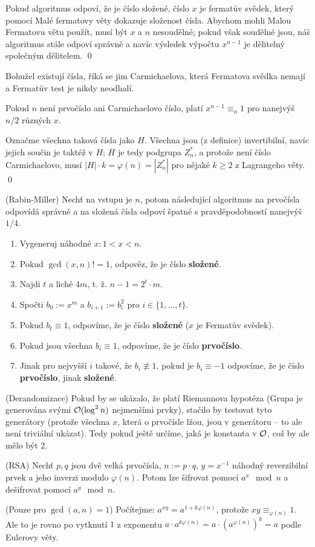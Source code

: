 \dk Pokud algoritmus odpoví, že je číslo složené, číslo $x$ je fermatův svědek,
který pomocí Malé fermatovy věty dokazuje složenost čísla. Abychom mohli Malou
Fermatovu větu použít, musí být $x$ a $n$ nesoudělné; pokud však soudělné jsou,
náš algoritmus stále odpoví správně a navíc výsledek výpočtu $x^{n-1}$ je
dělitelný společným dělitelem. \qed

\poz Bohužel existují čísla, říká se jim Carmichaelova, která Fermatova svědka
nemají a Fermatův test je nikdy neodhalí.

\vt Pokud $n$ není prvočíslo ani Carmichaelovo číslo, platí $x^{n-1} \equiv_n
1$ pro nanejvýš $n/2$ různých $x$.

\dk Označme všechna taková čísla jako $H$. Všechna jsou (z definice)
invertibilní, navíc jejich součin je taktéž v $H$; $H$ je tedy podgrupa $Z_n^*$,
a protože není číslo Carmichaelovo, musí $|H| \cdot k = \varphi(n) = |Z_n^*|$
pro nějaké $k \geq 2$ z Lagrangeho věty. \qed

\alg (Rabin-Miller) Nechť na vstupu je $n$, potom následující algoritmus na
prvočísla odpovídá správně a na složená čísla odpoví špatně s pravděpodobností
nanejvýš $1/4$.
\begin{enumerate}
	\item Vygeneruj náhodné $x: 1 < x < n$.
	\item Pokud $\gcd(x,n) != 1$, odpověz, že je číslo {\bf složené}.
	\item Najdi $t$ a liché 4$m$, t. ž. $n-1 = 2^t \cdot m$.
	\item Spočti $b_0 := x^m$ a $b_{i+1} := b_i^2$ pro $i\in \{1, \dots, t\}$.
	\item Pokud $b_t \equiv 1$, odpovíme, že je číslo {\bf složené} ($x$ je
		Fermatův svědek).
	\item Pokud jsou všechna $b_i \equiv 1$, odpovíme, že je číslo {\bf
		prvočíslo}.
	\item Jinak pro nejvyšší $i$ takové, že $b_i \not\equiv 1$, pokud je $b_i
		\equiv -1$ odpovíme, že je číslo {\bf prvočíslo}, jinak {\bf složené}.
\end{enumerate}

\pzn (Derandomizace) Pokud by se ukázalo, že platí Riemannova hypotéza (Grupa je
generována svými $\mathcal{O}(\log^2 n)$ nejmenšími prvky), stačilo by testovat tyto
generátory (protože všechna $x$, která o prvočísle lžou, jsou v generátoru -- to
ale není triviální ukázat). Tedy pokud ještě určíme, jaká je konstanta v $\mathcal{O}$,
což by ale mělo být $2$.

\alg (RSA) Nechť $p,q$ jsou dvě velká prvočísla, $n := p \cdot q$, $y = x^{-1}$
náhodný reverzibilní prvek a jeho inverzi modulo $\varphi(n)$. Potom lze
šifrovat pomocí $a^x \mod n$ a dešifrovat pomocí $a^y \mod n$.

\dk (Pouze pro $\gcd(a,n) = 1$) Počítejme: $a^{xy} = a^{1 + k\varphi(n)}$,
protože $xy \equiv_{\varphi(n)} 1$. Ale to je rovno po vytknutí $1$ z exponentu
$a \cdot a^{k\varphi(n)} = a \cdot (a^{\varphi(n)})^k = a$ podle Eulerovy věty.
